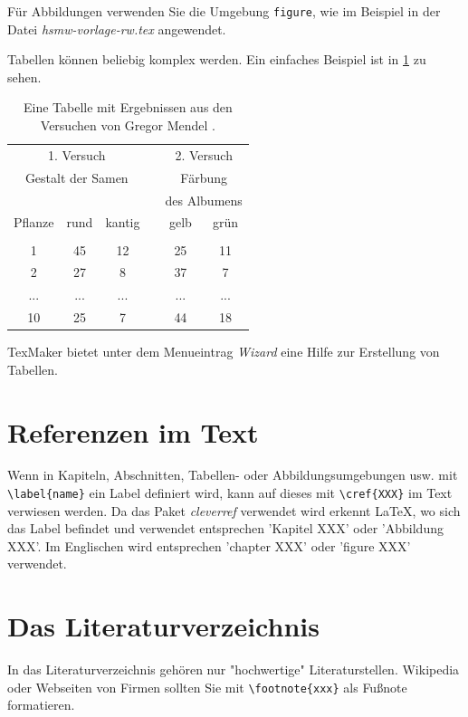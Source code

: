 Für Abbildungen verwenden Sie die Umgebung \texttt{figure}, wie im Beispiel in der Datei \textit{hsmw-vorlage-rw.tex} angewendet. 

Tabellen können beliebig komplex werden. Ein einfaches Beispiel ist in \cref{tab:mendel} zu sehen.

\begin{table}
\centering
\begin{tabular}{cccccc}
\hline
\multicolumn{3}{c}{1. Versuch} &  & \multicolumn{2}{c}{2. Versuch}\\
\multicolumn{3}{c}{Gestalt der Samen} & & \multicolumn{2}{c}{Färbung }\\
& & & & \multicolumn{2}{c}{des Albumens}\\
Pflanze & rund & kantig &   &  gelb &  grün  \\
\cline{1-3} \cline{5-6} \\
1 & 45 & 12 &   &  25 &  11  \\
2 & 27 & 8 &   &  37 &  7  \\
... & ... & ... &   &  ... &  ...  \\
10 & 25 & 7 &   &  44 &  18  \\
\hline
\end{tabular}
\caption{Eine Tabelle mit Ergebnissen aus den Versuchen von Gregor Mendel \citep{Mendel1866}.}
\label{tab:mendel}
\end{table}

TexMaker bietet unter dem Menueintrag \textit{Wizard} eine Hilfe zur Erstellung von Tabellen. 

\chapter{Referenzen im Text}
\label{cha:refs}
Wenn in Kapiteln, Abschnitten, Tabellen- oder Abbildungsumgebungen usw. mit \verb+\label{name}+ ein Label definiert wird, kann auf dieses mit \verb+\cref{XXX}+ im Text verwiesen werden. Da das Paket \textit{cleverref} verwendet wird erkennt LaTeX, wo sich das Label befindet und verwendet entsprechen 'Kapitel XXX' oder 'Abbildung XXX'. Im Englischen wird entsprechen 'chapter XXX' oder 'figure XXX' verwendet.

	
\chapter{Das Literaturverzeichnis}
\label{cha:bibliography}
In das Literaturverzeichnis gehören nur "hochwertige" Literaturstellen. Wikipedia oder Webseiten von Firmen sollten Sie mit \verb+\footnote{xxx}+ als Fußnote formatieren.

